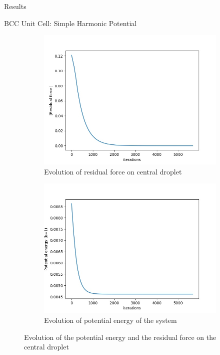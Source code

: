 \documentclass[12pt]{article}
\begin{document}
\begin{section}{Results}
\begin{subsection}{BCC Unit Cell: Simple Harmonic Potential}
\begin{figure}[h!]
    \begin{subfigure}{0.5\textwidth}
        \includegraphics[width=\linewidth]{images/RF_bcc.jpg}
        \caption{Evolution of residual force on central droplet}
        \label{fig:sub1}
    \end{subfigure}
    \begin{subfigure}{0.5\textwidth}
        \includegraphics[width=\linewidth]{images/U_bcc.jpg}
        \caption{Evolution of potential energy of the system}
        \label{fig:sub2}
    \end{subfigure}
    \caption{Evolution of the potential energy and the residual force on the central droplet}
\end{figure}



\end{subsection}
\end{section}
\end{document}
